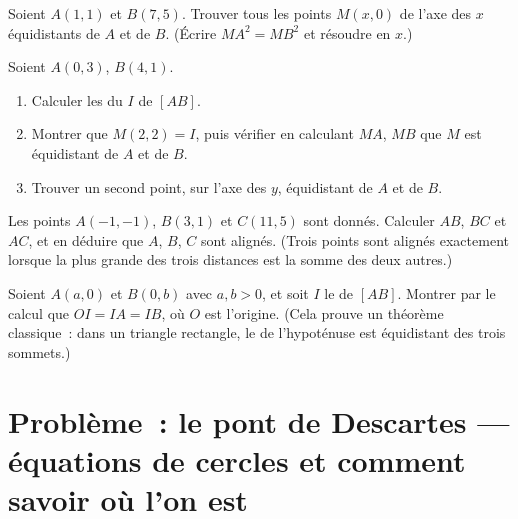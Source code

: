 \begin{exercise}[$\star\star$]\label{exo:g10:coordgeom:7}
Soient $A(1, 1)$ et $B(7, 5)$. Trouver tous les points $M(x, 0)$ de
l'axe des $x$ équidistants de $A$ et de $B$. (Écrire $MA^2 = MB^2$ et
résoudre en $x$.)
\end{exercise}

\begin{exercise}[$\star\star$]\label{exo:g10:coordgeom:8}
Soient $A(0, 3)$, $B(4, 1)$.
\begin{enumerate}
  \item Calculer les  du  $I$ de $[AB]$.
  \item Montrer que $M(2, 2) = I$, puis vérifier en calculant $MA$, $MB$
        que $M$ est équidistant de $A$ et de $B$.
  \item Trouver un second point, sur l'axe des $y$, équidistant de $A$ et
        de $B$.
\end{enumerate}
\end{exercise}

\begin{exercise}[$\star\star$]\label{exo:g10:coordgeom:9}
Les points $A(-1, -1)$, $B(3, 1)$ et $C(11, 5)$ sont donnés. Calculer
$AB$, $BC$ et $AC$, et en déduire que $A$, $B$, $C$ sont alignés.
(Trois points sont alignés exactement lorsque la plus grande des trois
distances est la somme des deux autres.)
\end{exercise}

\begin{exercise}[$\star\star\star$]\label{exo:g10:coordgeom:10}
Soient $A(a, 0)$ et $B(0, b)$ avec $a, b > 0$, et soit $I$ le  de
$[AB]$. Montrer par le calcul que $OI = IA = IB$, où $O$ est l'origine.
(Cela prouve un théorème classique~: dans un triangle rectangle, le
 de l'hypoténuse est équidistant des trois sommets.)
\end{exercise}

\section{Problème~: le pont de Descartes --- équations de cercles et
comment savoir où l'on est}

